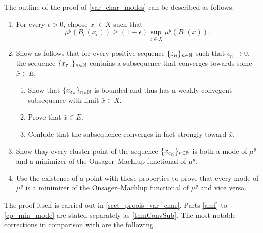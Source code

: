 \documentclass[english]{jnsao}
\theoremstyle{definition}
\begin{document}
The outline of the proof of \cref{var_char_modes} can be described as follows.
\begin{enumerate}
	\item \label{amf} For every $\epsilon > 0$, choose $x_\epsilon \in X$ such that
	\begin{equation}
		\label{def:amf}
		\mu^y(B_\epsilon(x_\epsilon)) \ge (1 - \epsilon) \sup_{x \in X} \mu^y(B_\epsilon(x)).
	\end{equation}
	\item Show as follows that for every positive sequence $\{\varepsilon_n\}_{n\in\mathbb{N}}$ such that $\epsilon_n \to 0$, the sequence $\{x_{\varepsilon_n}\}_{n\in\mathbb{N}}$ contains a subsequence that converges towards some $\bar{x} \in E$.
	\begin{enumerate}
		\item Show that $\{x_{\varepsilon_n}\}_{n\in\mathbb{N}}$ is bounded and thus has a weakly convegent subsequence with limit $\bar{x} \in X$.
		\item Prove that $\bar{x} \in E$.
		\item Conlude that the subsequence converges in fact strongly toward $\bar{x}$.
	\end{enumerate}
	\item \label{cp_min_mode} Show thay every cluster point of the sequence $\{x_{\varepsilon_n}\}_{n\in\mathbb{N}}$ is both a mode of $\mu^y$ and a minimizer of the Onsager--Machlup functional of $\mu^y$.
	\item Use the existence of a point with these properties to prove that every mode of $\mu^y$ is a minimizer of the Onsager--Machlup functional of $\mu^y$ and vice versa.
\end{enumerate}
The proof itself is carried out in \cref{sect_proofs_var_char}. Parts \ref{amf} to \ref{cp_min_mode} are stated separately as \cref{thmConvSub}.
The most notable corrections in comparison with \cite{Dashti:2013} are the following.
\end{document}
